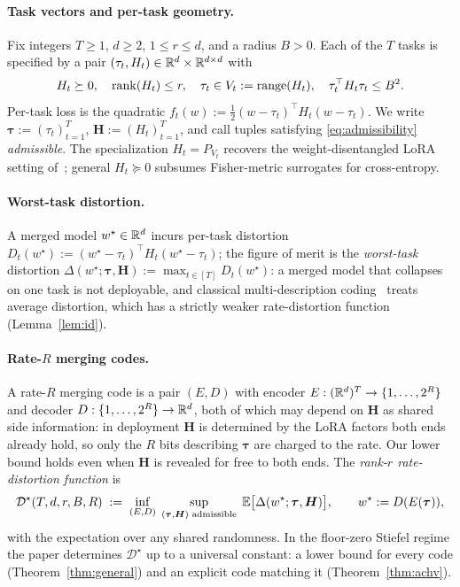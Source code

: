 \paragraph{Task vectors and per-task geometry.} Fix integers $T \geq 1$,
$d \geq 2$, $1 \leq r \leq d$, and a radius $B > 0$. Each of the $T$
tasks is specified by a pair $(\tau_t, H_t) \in \mathbb{R}^d \times \mathbb{R}^{d\times d}$
with
\begin{equation}\label{eq:admissibility}
  H_t \succeq 0,\quad \operatorname{rank}(H_t) \leq r,\quad \tau_t \in V_t :=
  \operatorname{range}(H_t),\quad \tau_t^\top H_t \tau_t \leq B^2.
\end{equation}
Per-task loss is the quadratic $f_t(w) := \tfrac12 (w - \tau_t)^\top
H_t (w - \tau_t)$. We write $\boldsymbol\tau := (\tau_t)_{t=1}^T$,
$\boldsymbol H := (H_t)_{t=1}^T$, and call tuples satisfying
\eqref{eq:admissibility} \emph{admissible}. The specialization
$H_t = P_{V_t}$ recovers the weight-disentangled LoRA setting
of~\citet{ortizjimenez2023disentanglement}; general $H_t \succeq 0$
subsumes Fisher-metric surrogates for cross-entropy.

\paragraph{Worst-task distortion.} A merged model $w^\star \in \mathbb{R}^d$
incurs per-task distortion $D_t(w^\star) := (w^\star - \tau_t)^\top H_t
(w^\star - \tau_t)$; the figure of merit is the \emph{worst-task}
distortion $\Delta(w^\star; \boldsymbol\tau, \boldsymbol H) :=
\max_{t\in[T]} D_t(w^\star)$: a merged model that collapses on one
task is not deployable, and classical multi-description
coding~\citep{elgamalcover1982md} treats average distortion, which has
a strictly weaker rate-distortion function (Lemma~\ref{lem:id}).

\paragraph{Rate-$R$ merging codes.} A rate-$R$ merging code is a pair
$(E, D)$ with encoder $E : (\mathbb{R}^d)^T \to \{1,\ldots,2^R\}$ and decoder
$D : \{1,\ldots,2^R\} \to \mathbb{R}^d$, both of which may depend on
$\boldsymbol H$ as shared side information: in deployment
$\boldsymbol H$ is determined by the LoRA factors both ends already
hold, so only the $R$ bits describing $\boldsymbol\tau$ are charged to
the rate. Our lower bound holds even when $\boldsymbol H$ is revealed
for free to both ends. The \emph{rank-$r$ rate-distortion function} is
\begin{equation}\label{eq:rd-def}
  \mathcal{D}^\star(T, d, r, B, R)
  \;:=\; \inf_{(E, D)}\;\sup_{(\boldsymbol\tau, \boldsymbol H)
    \text{ admissible}}\;
  \mathbb{E}\bigl[\Delta(w^\star;\boldsymbol\tau, \boldsymbol H)\bigr],
  \qquad w^\star := D(E(\boldsymbol\tau)),
\end{equation}
with the expectation over any shared randomness. In the floor-zero
Stiefel regime the paper determines $\mathcal{D}^\star$ up to a
universal constant: a lower bound for every code
(Theorem~\ref{thm:general}) and an explicit code matching it
(Theorem~\ref{thm:achv}).

